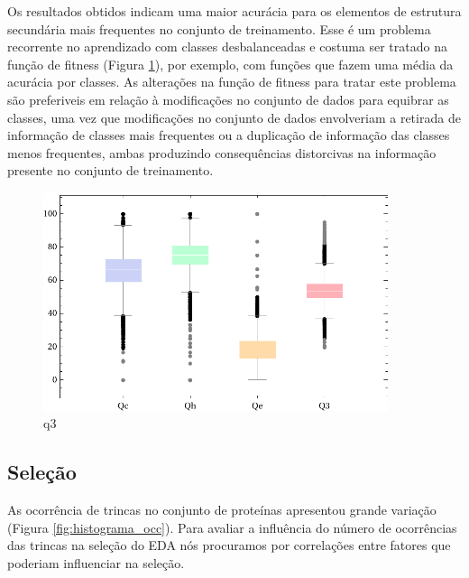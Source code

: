 Os resultados obtidos indicam uma maior acurácia para os elementos de estrutura secundária mais frequentes no conjunto de treinamento. Esse é um problema recorrente no aprendizado com classes desbalanceadas e costuma ser tratado na função de fitness (Figura \ref{fig:q3}), por exemplo, com funções que fazem uma média da acurácia por classes. As alterações na função de fitness para tratar este problema são preferiveis em relação à modificações no conjunto de dados para equibrar as classes, uma vez que modificações no conjunto de dados envolveriam a retirada de informação de classes mais frequentes ou a duplicação de informação das classes menos frequentes, ambas produzindo consequências distorcivas na informação presente no conjunto de treinamento.

\begin{figure}
  \centering
  \includegraphics[width=0.9\textwidth]{figures/q3.pdf}
  \caption{q3}
        \label{fig:q3}
\end{figure}






\subsection{Seleção}

As ocorrência de trincas no conjunto de proteínas apresentou grande variação (Figura \ref{fig:histograma_occ}). Para avaliar a influência do número de ocorrências das trincas na seleção do EDA nós procuramos por correlações entre fatores que poderiam influenciar na seleção.

